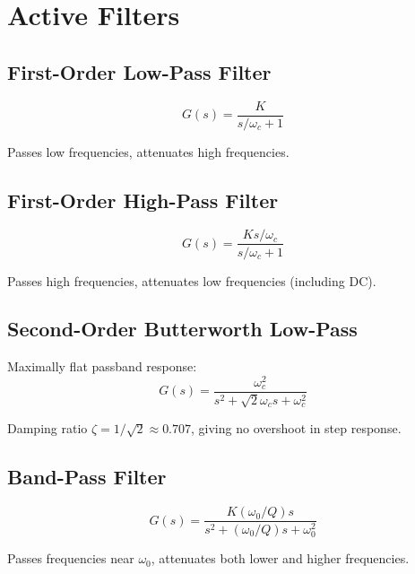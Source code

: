 \section{Active Filters}
\label{sec:active_filters}

\subsection{First-Order Low-Pass Filter}

\begin{equation}
G(s) = \frac{K}{s/\omega_c + 1}
\end{equation}

Passes low frequencies, attenuates high frequencies.

\subsection{First-Order High-Pass Filter}

\begin{equation}
G(s) = \frac{Ks/\omega_c}{s/\omega_c + 1}
\end{equation}

Passes high frequencies, attenuates low frequencies (including DC).

\subsection{Second-Order Butterworth Low-Pass}

Maximally flat passband response:
\begin{equation}
G(s) = \frac{\omega_c^2}{s^2 + \sqrt{2}\omega_c s + \omega_c^2}
\end{equation}

Damping ratio $\zeta = 1/\sqrt{2} \approx 0.707$, giving no overshoot in step response.

\subsection{Band-Pass Filter}

\begin{equation}
G(s) = \frac{K(\omega_0/Q)s}{s^2 + (\omega_0/Q)s + \omega_0^2}
\end{equation}

Passes frequencies near $\omega_0$, attenuates both lower and higher frequencies.



